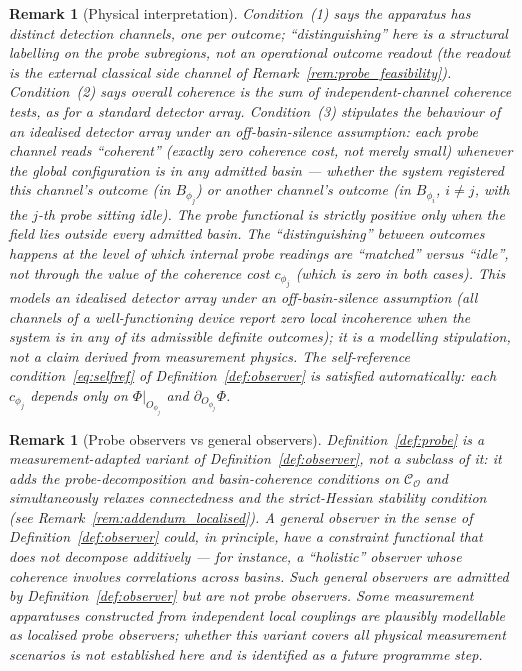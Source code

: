 \documentclass[12pt]{article}
\newtheorem{remark}[theorem]{Remark}
\newcommand{\Ocal}{\mathcal{O}}
\newcommand{\Ccal}{\mathcal{C}}
\begin{document}
\begin{remark}[Physical interpretation]\label{rem:probe_interp}
Condition~(1) says the apparatus has distinct detection channels, one per outcome; ``distinguishing'' here is a structural labelling on the probe subregions, not an operational outcome readout (the readout is the external classical side channel of Remark~\ref{rem:probe_feasibility}). Condition~(2) says overall coherence is the sum of independent-channel coherence tests, as for a standard detector array. Condition~(3) stipulates the behaviour of an idealised detector array under an off-basin-silence assumption: each probe channel reads ``coherent'' (exactly zero coherence cost, not merely small) whenever the global configuration is in \emph{any} admitted basin --- whether the system registered this channel's outcome (in $B_{\phi_j}$) or another channel's outcome (in $B_{\phi_i}$, $i \neq j$, with the $j$-th probe sitting idle). The probe functional is strictly positive only when the field lies outside every admitted basin. The ``distinguishing'' between outcomes happens at the level of which internal probe readings are ``matched'' versus ``idle'', not through the value of the coherence cost $c_{\phi_j}$ (which is zero in both cases). This \emph{models} an idealised detector array under an off-basin-silence assumption (all channels of a well-functioning device report zero local incoherence when the system is in any of its admissible definite outcomes); it is a modelling stipulation, not a claim derived from measurement physics. The self-reference condition~\eqref{eq:selfref} of Definition~\ref{def:observer} is satisfied automatically: each $c_{\phi_j}$ depends only on $\Phi|_{O_{\phi_j}}$ and $\partial_{O_{\phi_j}}\Phi$.
\end{remark}

\begin{remark}[Probe observers vs general observers]\label{rem:scope_probe}
Definition~\ref{def:probe} is a \emph{measurement-adapted variant} of Definition~\ref{def:observer}, not a subclass of it: it adds the probe-decomposition and basin-coherence conditions on $\Ccal_\Ocal$ and simultaneously relaxes connectedness and the strict-Hessian stability condition (see Remark~\ref{rem:addendum_localised}). A general observer in the sense of Definition~\ref{def:observer} could, in principle, have a constraint functional that does not decompose additively --- for instance, a ``holistic'' observer whose coherence involves correlations across basins. Such general observers are admitted by Definition~\ref{def:observer} but are not probe observers. Some measurement apparatuses constructed from independent local couplings are plausibly modellable as localised probe observers; whether this variant covers all physical measurement scenarios is not established here and is identified as a future programme step.
\end{remark}
\end{document}

